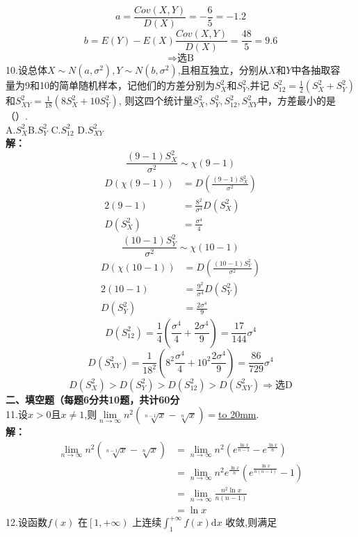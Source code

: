 \documentclass[a4paper]{article}
\begin{document}
  $$a=\frac{Cov(X,Y)}{D(X)}=-\frac{6}{5}=-1.2$$
  $$b=E(Y)-E(X)\frac{Cov(X,Y)}{D(X)}=\frac{48}{5}=9.6$$
  $$\Rightarrow \text{选B}$$
10.设总体$X\sim N\left(a,\sigma^2 \right),Y\sim N(b,\sigma^2)$,且相互独立，分别从$X$和$Y$中各抽取容\\
量为9和10的简单随机样本，记他们的方差分别为$S_X^2$和$S_Y^2$,并记
$S_{12}^2=\frac{1}{2}\left(S_X^2+S_Y^2\right)$\\和$S_{XY}^2=\frac{1}{18}\left(8S_X^2+10S_Y^2\right)$,
则这四个统计量$S_X^2,S_Y^2,S_{12}^2,S_{XY}^2$中，方差最小的是（\quad）.\\
A.$S_X^2$\hfill B.$S_Y^2$ \hfill C.$S_{12}^2$ \hfill D.$S_{XY}^2$\\
\textbf{解：}
$$\frac{(9-1)S_X^2}{\sigma^2} \sim \chi(9-1)$$
\begin{align*}
    D(\chi(9-1))&=D(\frac{(9-1)S_X^2}{\sigma^2})\\
    2(9-1)&=\frac{8^2}{\sigma^4}D(S_X^2)\\
    D(S_X^2)&=\frac{\sigma^4}{4}
\end{align*}
$$\frac{(10-1)S_Y^2}{\sigma^2} \sim \chi(10-1)$$
\begin{align*}
    D(\chi(10-1))&=D(\frac{(10-1)S_Y^2}{\sigma^2})\\
    2(10-1)&=\frac{9^2}{\sigma^4}D(S_Y^2)\\
    D(S_Y^2)&=\frac{2\sigma^4}{9}
\end{align*}
$$D(S_{12}^2)=\frac{1}{4}(\frac{\sigma^4}{4}+\frac{2\sigma^4}{9})=\frac{17}{144}\sigma^4$$
$$D(S_{XY}^2)=\frac{1}{18^2}(8^2\frac{\sigma^4}{4}+10^2\frac{2\sigma^4}{9})=\frac{86}{729}\sigma^4$$
$$D(S_X^2)>D(S_Y^2)>D(S_{12}^2)>D(S_{XY}^2)\Rightarrow \text{选D}$$
\noindent
\textbf{二、填空题（每题6分共10题，共计60分}\\
11.设$x>0$且$x\neq 1$,则$\lim\limits_{n\to \infty }n^2\left(\sqrt[n-1]{x}-\sqrt[n]{x}\right)=$\underline{\hbox to 20mm{}}.\\
\textbf{解：}
\begin{align*}
    \lim\limits_{n\to\infty} n^2\left(\sqrt[n-1]{x}-\sqrt[n]{x}\right)
    &=\lim\limits_{n\to \infty} n^2 \left(e^{\frac{\ln x}{n-1}}-e^{\frac{\ln x}{n}}\right)\\
    &=\lim\limits_{n\to\infty} n^2 e^{\frac{\ln x}{n}} \left(e^{\frac{\ln x}{n(n-1)}}-1\right)\\
    &=\lim\limits_{n\to\infty} \frac{n^2\ln x}{n(n-1)}\\
    &=\ln x
\end{align*}
12.设函数$f(x)$ 在$\left[1,+\infty\right)$ 上连续$\int_{1}^{+\infty} f(x)\mathrm{d}x $ 收敛,则满足\\
\end{document}
